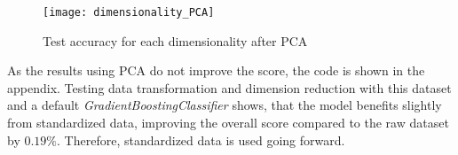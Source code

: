 \begin{figure}[H]
    \caption{Test accuracy for each dimensionality after PCA}
	\label{fig:Score for each PCA dimensionality}
    \texttt{[image: dimensionality\_PCA]}
\end{figure}

As the results using \ac{PCA} do not improve the score, the code is shown in the appendix.
Testing data transformation and dimension reduction with this dataset and a default \emph{GradientBoostingClassifier}
shows, that the model benefits slightly from standardized data, improving the overall score compared to the raw dataset
by $0.19\%$. Therefore, standardized data is used going forward.


%
%
%
%
%
%
%
